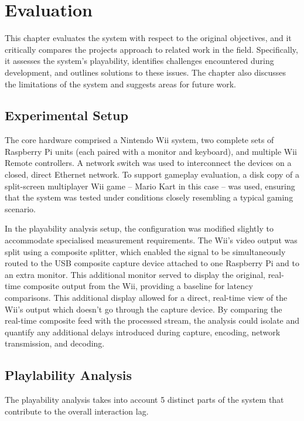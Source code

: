 \chapter{Evaluation}
\label{chapter:evaluation}

This chapter evaluates the system with respect to the original objectives, and it critically compares the projects approach to related work in the field. Specifically, it assesses the system's playability, identifies challenges encountered during development, and outlines solutions to these issues. The chapter also discusses the limitations of the system and suggests areas for future work.

\section{Experimental Setup}
\label{sec:experimental-setup}

The core hardware comprised a Nintendo Wii system, two complete sets of Raspberry Pi units (each paired with a monitor and keyboard), and multiple Wii Remote controllers. A network switch was used to interconnect the devices on a closed, direct Ethernet network. To support gameplay evaluation, a disk copy of a split-screen multiplayer Wii game -- Mario Kart in this case -- was used, ensuring that the system was tested under conditions closely resembling a typical gaming scenario.

In the playability analysis setup, the configuration was modified slightly to accommodate specialised measurement requirements. The Wii’s video output was split using a composite splitter, which enabled the signal to be simultaneously routed to the USB composite capture device attached to one Raspberry Pi and to an extra monitor. This additional monitor served to display the original, real-time composite output from the Wii, providing a baseline for latency comparisons. This additional display allowed for a direct, real-time view of the Wii’s output which doesn't go through the capture device. By comparing the real-time composite feed with the processed stream, the analysis could isolate and quantify any additional delays introduced during capture, encoding, network transmission, and decoding.

\section{Playlability Analysis}
\label{sec:playability-analysis}

The playability analysis takes into account 5 distinct parts of the system that
contribute to the overall interaction lag\cite{volkerseekerBestPaper}.

